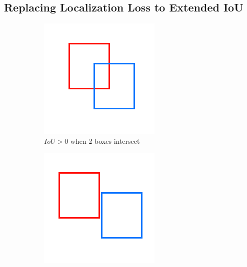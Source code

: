   \subsection{Replacing Localization Loss to Extended IoU}
  \begin{figure}[H]
      \centering
      \begin{subfigure}[][][t]{0.3\textwidth}
        \includegraphics[width=1\linewidth]{figures/iounot0.png}
        \caption{$IoU > 0$ when 2 boxes intersect}
        \label{fig:iouexist}
      \end{subfigure}\hfill
      \begin{subfigure}[][][t]{0.3\textwidth}
        \includegraphics[width=1\linewidth]{figures/iou0near.png}

\end{subfigure}
\end{figure}
